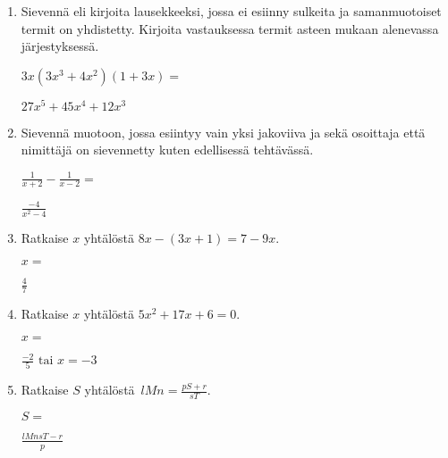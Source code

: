 \documentclass[finnish, a4paper, 12pt]{article}
\begin{document}
\begin{enumerate}[leftmargin=*]
		\vspace{8pt}
		
		\item %
		Sievennä eli kirjoita lausekkeeksi, jossa ei esiinny sulkeita ja 
		samanmuotoiset termit on yhdistetty. 
		Kirjoita vastauksessa termit asteen mukaan alenevassa järjestyksessä. 
		
		\(
		\displaystyle
		3x(3x^3 + 4x^2)(1 + 3x) = 
		\) %
		\begin{version:withAnswers}
		\( 27x^5 +45x^4 +12x^3 \)
		\end{version:withAnswers}
		
		\vspace{8pt}
		
		\item %
		Sievennä %
		muotoon, jossa esiintyy vain yksi jakoviiva ja sekä osoittaja
		että nimittäjä on sievennetty kuten edellisessä tehtävässä.
		
		\(
		\displaystyle
		\frac{1}{x+2}- \frac{1}{x - 2} =
		\) %
		\begin{version:withAnswers}
		\( \frac{- 4}{x^2  - 4} \)
		\end{version:withAnswers}
		
		\vspace{8pt}
		
		\item %
		Ratkaise \(x\) yhtälöstä \(8x - (3x+1) = 7 - 9x\).
		
		\(
		x = 
		\)	%
		\begin{version:withAnswers}
		 \( \frac{4}{7} \)
		\end{version:withAnswers}
		\vspace{8pt}
		
		\item %
		Ratkaise \(x\) yhtälöstä \(5 x^2  + 17 x + 6= 0\).
		
		\(
		x = 		
		\)	%
		
		\begin{version:withAnswers}
		\(\frac{-2}{5} \text{  tai } x = -3\)
		\end{version:withAnswers}
		\vspace{8pt}
		
		\item %
		Ratkaise \(S\) yhtälöstä 
		\(
		\displaystyle \,
		lMn = \frac{pS+r}{sT} .
		\)	
		
		\(
		S = 
		\) %
		\begin{version:withAnswers}
		\( \frac{lMnsT -r}{p}\)
		\end{version:withAnswers}
		
	\end{enumerate}
	
	
\end{document}
